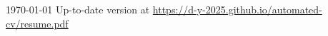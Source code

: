 \documentclass[11pt, a4paper]{awesome-cv}
\begin{document}
\makecvheader[C]

\makecvfooter
{\today}
{Up-to-date version at \upshape\color{text}\url{https://d-y-2025.github.io/automated-cv/resume.pdf}}
{\thepage}



\medskip
\vspace{1em}

\vspace{-1em}

\medskip

\end{document}
